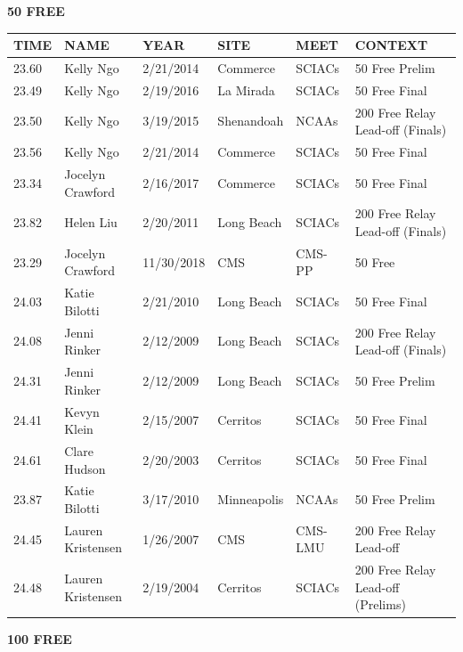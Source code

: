 \begin{table}[H]
\centering
\begin{minipage}[t]{0.48\textwidth}
\centering
\textbf{50 FREE}\\[0.1cm]
\begin{tabular}{@{}p{1.8cm}p{2.8cm}p{1.2cm}p{1.4cm}p{1.4cm}p{2.0cm}@{}}
\hline
    \textbf{TIME} & \textbf{NAME} & \textbf{YEAR} & \textbf{SITE} & \textbf{MEET} & \textbf{CONTEXT} \\
\hline
    23.60 & Kelly Ngo & 2/21/2014 & Commerce & SCIACs & 50 Free Prelim \\
    23.49 & Kelly Ngo & 2/19/2016 & La Mirada & SCIACs & 50 Free Final \\
    23.50 & Kelly Ngo & 3/19/2015 & Shenandoah & NCAAs & 200 Free Relay Lead-off (Finals) \\
    23.56 & Kelly Ngo & 2/21/2014 & Commerce & SCIACs & 50 Free Final \\
    23.34 & Jocelyn Crawford & 2/16/2017 & Commerce & SCIACs & 50 Free Final \\
    23.82 & Helen Liu & 2/20/2011 & Long Beach & SCIACs & 200 Free Relay Lead-off (Finals) \\
    23.29 & Jocelyn Crawford & 11/30/2018 & CMS & CMS-PP & 50 Free \\
    24.03 & Katie Bilotti & 2/21/2010 & Long Beach & SCIACs & 50 Free Final \\
    24.08 & Jenni Rinker & 2/12/2009 & Long Beach & SCIACs & 200 Free Relay Lead-off (Finals) \\
    24.31 & Jenni Rinker & 2/12/2009 & Long Beach & SCIACs & 50 Free Prelim \\
    24.41 & Kevyn Klein & 2/15/2007 & Cerritos & SCIACs & 50 Free Final \\
    24.61 & Clare Hudson & 2/20/2003 & Cerritos & SCIACs & 50 Free Final \\
    23.87 & Katie Bilotti & 3/17/2010 & Minneapolis & NCAAs & 50 Free Prelim \\
    24.45 & Lauren Kristensen & 1/26/2007 & CMS & CMS-LMU & 200 Free Relay Lead-off \\
    24.48 & Lauren Kristensen & 2/19/2004 & Cerritos & SCIACs & 200 Free Relay Lead-off (Prelims) \\
\hline
\end{tabular}
\end{minipage}\hfill
\begin{minipage}[t]{0.48\textwidth}
\centering
\textbf{100 FREE}\\[0.1cm]
\begin{tabular}{@{}p{1.8cm}p{2.8cm}p{1.2cm}p{1.4cm}p{1.4cm}p{2.0cm}@{}}

\end{tabular}
\end{minipage}
\end{table}
